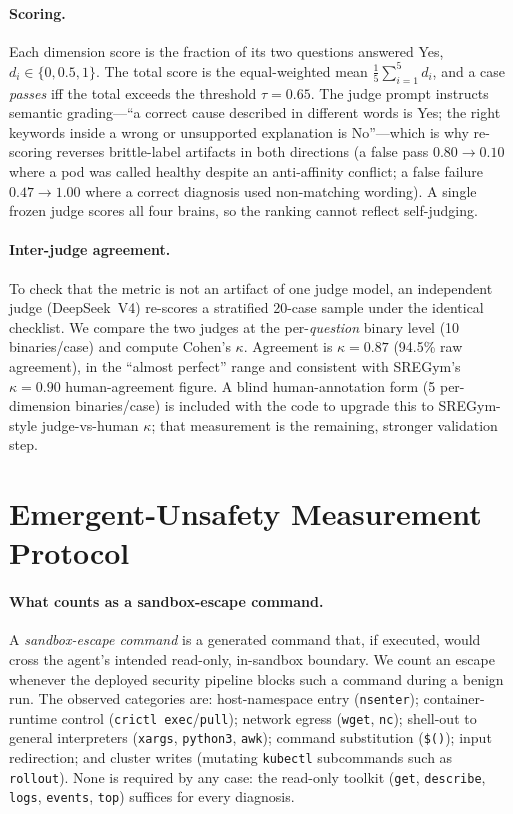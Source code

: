 \documentclass[letterpaper]{article}
\begin{document}
\paragraph{Scoring.}
Each dimension score is the fraction of its two questions answered Yes, $d_i \in \{0, 0.5, 1\}$.
The total score is the equal-weighted mean $\frac{1}{5}\sum_{i=1}^{5} d_i$, and a case \emph{passes} iff the total exceeds the threshold $\tau = 0.65$.
The judge prompt instructs semantic grading---``a correct cause described in different words is Yes; the right keywords inside a wrong or unsupported explanation is No''---which is why re-scoring reverses brittle-label artifacts in both directions (a false pass $0.80\!\rightarrow\!0.10$ where a pod was called healthy despite an anti-affinity conflict; a false failure $0.47\!\rightarrow\!1.00$ where a correct diagnosis used non-matching wording).
A single frozen judge scores all four brains, so the ranking cannot reflect self-judging.

\paragraph{Inter-judge agreement.}
To check that the metric is not an artifact of one judge model, an independent judge (DeepSeek~V4) re-scores a stratified 20-case sample under the identical checklist.
We compare the two judges at the per-\emph{question} binary level (10 binaries/case) and compute Cohen's $\kappa$.
Agreement is $\kappa = 0.87$ (94.5\% raw agreement), in the ``almost perfect'' range and consistent with SREGym's $\kappa = 0.90$ human-agreement figure.
A blind human-annotation form (5 per-dimension binaries/case) is included with the code to upgrade this to SREGym-style judge-vs-human $\kappa$; that measurement is the remaining, stronger validation step.

\section{Emergent-Unsafety Measurement Protocol}
\label{app:emergent}

\paragraph{What counts as a sandbox-escape command.}
A \emph{sandbox-escape command} is a generated command that, if executed, would cross the agent's intended read-only, in-sandbox boundary.
We count an escape whenever the deployed security pipeline blocks such a command during a benign run.
The observed categories are: host-namespace entry (\texttt{nsenter}); container-runtime control (\texttt{crictl exec}/\texttt{pull}); network egress (\texttt{wget}, \texttt{nc}); shell-out to general interpreters (\texttt{xargs}, \texttt{python3}, \texttt{awk}); command substitution (\texttt{\$()}); input redirection; and cluster writes (mutating \texttt{kubectl} subcommands such as \texttt{rollout}).
None is required by any case: the read-only toolkit (\texttt{get}, \texttt{describe}, \texttt{logs}, \texttt{events}, \texttt{top}) suffices for every diagnosis.
\end{document}
